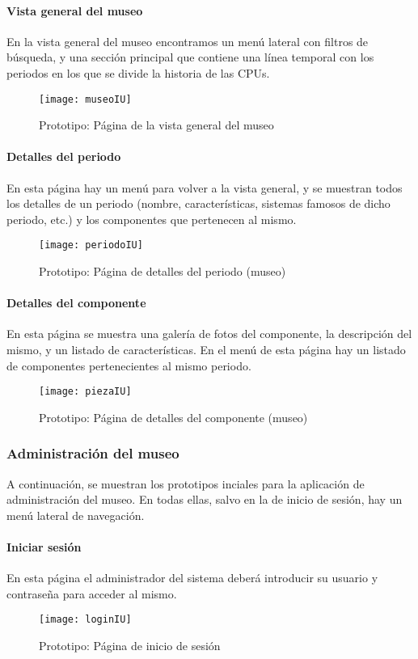 \paragraph*{Vista general del museo}
En la vista general del museo encontramos un menú lateral con filtros de búsqueda, y una sección principal que contiene una línea temporal con los periodos en los que se divide la historia de las CPUs.
\begin{figure}[H]
\centering
\texttt{[image: museoIU]}
\caption{Prototipo: Página de la vista general del museo}
\end{figure}
\paragraph*{Detalles del periodo}
En esta página hay un menú para volver a la vista general, y se muestran todos los detalles de un periodo (nombre, características, sistemas famosos de dicho periodo, etc.) y los componentes que pertenecen al mismo. 
\begin{figure}[H]
\centering
\texttt{[image: periodoIU]}
\caption{Prototipo: Página de detalles del periodo (museo)}
\end{figure}
\paragraph*{Detalles del componente}
En esta página se muestra una galería de fotos del componente, la descripción del mismo, y un listado de características. En el menú de esta página hay un listado de componentes pertenecientes al mismo periodo.
\begin{figure}[H]
\centering
\texttt{[image: piezaIU]}
\caption{Prototipo: Página de detalles del componente (museo)}
\end{figure}

\subsubsection{Administración del museo}
A continuación, se muestran los prototipos inciales para la aplicación de administración del museo. En todas ellas, salvo en la de inicio de sesión, hay un menú lateral de navegación. 
\paragraph*{Iniciar sesión}
En esta página el administrador del sistema deberá introducir su usuario y contraseña para acceder al mismo.
\begin{figure}[H]
\centering
\texttt{[image: loginIU]}
\caption{Prototipo: Página de inicio de sesión}
\end{figure}
